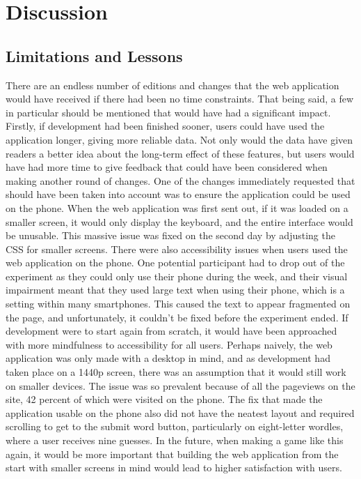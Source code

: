 
\chapter{Discussion}

\section{Limitations and Lessons}
There are an endless number of editions and changes that the web application would have received if there had been no time constraints. That being said, a few in particular should be mentioned that would have had a significant impact.
Firstly, if development had been finished sooner, users could have used the application longer, giving more reliable data. Not only would the data have given readers a better idea about the long-term effect of these features, but users would have had more time to give feedback that could have been considered when making another round of changes. 
One of the changes immediately requested that should have been taken into account was to ensure the application could be used on the phone. When the web application was first sent out, if it was loaded on a smaller screen, it would only display the keyboard, and the entire interface would be unusable. This massive issue was fixed on the second day by adjusting the CSS for smaller screens. 
There were also accessibility issues when users used the web application on the phone. One potential participant had to drop out of the experiment as they could only use their phone during the week, and their visual impairment meant that they used large text when using their phone, which is a setting within many smartphones. This caused the text to appear fragmented on the page, and unfortunately, it couldn’t be fixed before the experiment ended. If development were to start again from scratch, it would have been approached with more mindfulness to accessibility for all users.
 Perhaps naively, the web application was only made with a desktop in mind, and as development had taken place on a 1440p screen, there was an assumption that it would still work on smaller devices. The issue was so prevalent because of all the pageviews on the site, 42 percent of which were visited on the phone. The fix that made the application usable on the phone also did not have the neatest layout and required scrolling to get to the submit word button, particularly on eight-letter wordles, where a user receives nine guesses. In the future, when making a game like this again, it would be more important that building the web application from the start with smaller screens in mind would lead to higher satisfaction with users.
